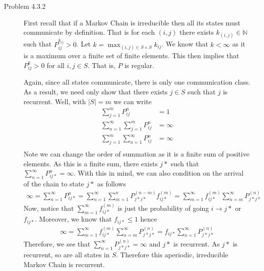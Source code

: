 \documentclass[12pt]{article}  %
\newcommand{\N}{{\mathbb{N}}}
\begin{document}
\begin{description}
\item[Problem 4.3.2] First recall that if a Markov Chain is irreducible then all its states must communicate by definition. That is for each $(i,j)$ there exists $k_{(i,j)}\in\N$ such that $P_{ij}^{k_{ij}}>0$. Let $k = \max_{(i,j)\in S\times S} k_{ij}$. We know that $k<\infty$ as it is a maximum over a finite set of finite elements. This then implies that$P_{ij}^{k}>0$ for all $i,j\in S$. That is, $P$ is regular. 

Again, since all states communicate, there is only one communication class. As a result, we need only show that there exists $j\in S$ such that $j$ is recurrent. Well, with $|S| = m$ we can write 
\begin{align*}
\sum_{j=1}^{m}P_{ij}^{n} &= 1\\
\sum_{n=1}^{\infty}\sum_{j=1}^{m}P_{ij}^{n} &= \infty\\
\sum_{j=1}^{m}\sum_{n=1}^{\infty}P_{ij}^{n} &= \infty\\
\end{align*}
Note we can change the order of summation as it is a finite sum of positive elements. As this is a finite sum, there exists $j*$ such that $\sum_{n=1}^{\infty}P_{ij*}^{n} = \infty$. With this in mind, we can also condition on the arrival of the chain to state $j*$ as follows
\begin{align*}
\infty = \sum_{n=1}^{\infty}P_{ij*}^{n} = \sum_{n=1}^{\infty}\sum_{m=1}^n P_{j*j*}^{(n-m)}f_{ij*}^{(m)} = \sum_{m=1}^{\infty}f_{ij*}^{(m)}\sum_{n=m}^{\infty} P_{j*j*}^{(n)}
\end{align*}
Now, notice that $\sum_{m=1}^{\infty}f_{ij*}^{(m)}$ is just the probability of going $i\to j*$ or $f_{ij*}$. Moreover, we know that $f_{ij*}\leq 1$ hence 
\begin{align*}
\infty = \sum_{m=1}^{\infty}f_{ij*}^{(m)}\sum_{n=m}^{\infty} P_{j*j*}^{(n)} = f_{ij*}\sum_{n=1}^{\infty} P_{j*j*}^{(n)} 
\end{align*}
Therefore, we see that $\sum_{n=1}^{\infty} P_{j*j*}^{(n)} = \infty$ and $j*$ is recurrent. As $j*$ is recurrent, so are all states in $S$. Therefore this aperiodic, irreducible Markov Chain is recurrent. 

\end{description}	
\end{document}
